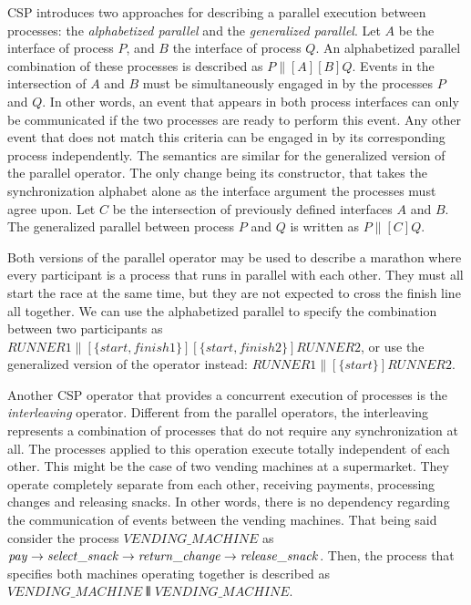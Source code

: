 CSP introduces two approaches for describing a parallel execution between processes: the \emph{alphabetized parallel} and the \emph{generalized parallel}. Let $ A $ be the interface of process $ P $, and $ B $ the interface of process $ Q $. An alphabetized parallel combination of these processes is described as $ P \parallel[A][B] Q $. Events in the intersection of $ A $ and $ B $ must be simultaneously engaged in by the processes $ P $ and $ Q $. In other words, an event that appears in both process interfaces can only be communicated if the two processes are ready to perform this event. Any other event that does not match this criteria can be engaged in by its corresponding process independently. The semantics are similar for the generalized version of the parallel operator. The only change being its constructor, that takes the synchronization alphabet alone as the interface argument the processes must agree upon. Let $ C $ be the intersection of previously defined interfaces $ A $ and $ B $. The generalized parallel between process $ P $ and $ Q $ is written as $ P \parallel[C] Q $.

Both versions of the parallel operator may be used to describe a marathon where every participant is a process that runs in parallel with each other. They must all start the race at the same time, but they are not expected to cross the finish line all together. We can use the alphabetized parallel to specify the combination between two participants as $ \mathit{RUNNER1} \parallel[\{start, finish1\}][\{start, finish2\}] \mathit{RUNNER2} $, or use the generalized version of the operator instead: $ \mathit{RUNNER1} \parallel[\{start\}] \mathit{RUNNER2} $.

Another CSP operator that provides a concurrent execution of processes is the \emph{interleaving} operator. Different from the parallel operators, the interleaving represents a combination of processes that do not require any synchronization at all. The processes applied to this operation execute totally independent of each other. This might be the case of two vending machines at a supermarket. They operate completely separate from each other, receiving payments, processing changes and releasing snacks. In other words, there is no dependency regarding the communication of events between the vending machines. That being said consider the process $ \mathit{VENDING\_MACHINE} $ as $ \mathit{pay} \mathrel{\rightarrow} \mathit{select\_snack} \mathrel{\rightarrow} \mathit{return\_change} \mathrel{\rightarrow} \mathit{release\_snack} $. Then, the process that specifies both machines operating together is described as $ \mathit{VENDING\_MACHINE} \interleave \mathit{VENDING\_MACHINE} $.


